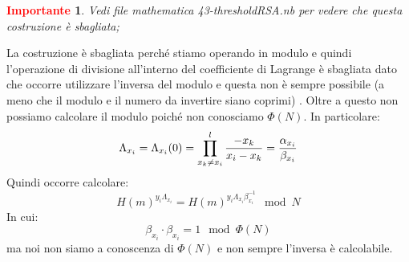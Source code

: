 \documentclass{book}
\newtheorem*{Importante}{\textbf{\textcolor{red}{Importante}}}
\begin{document}
\begin{Importante}
    Vedi file mathematica 43-thresholdRSA.nb per vedere che questa costruzione è sbagliata;
\end{Importante}
La costruzione è sbagliata perché stiamo operando in modulo e quindi l'operazione di divisione all'interno del coefficiente di Lagrange è sbagliata dato che occorre utilizzare l'inversa del modulo e questa non è sempre possibile (a meno che il modulo e il numero da invertire siano coprimi) \@. Oltre a questo non possiamo calcolare il modulo poiché non conosciamo \(\Phi(N)\).
In particolare:\begin{equation*}
    \centering
    \Lambda_{x_{i}}=\Lambda_{x_{i}}(0)=\prod_{x_{k}\neq x_{i}}^{l}{\frac{-x_{k}}{x_{i}-x_{k}}}=\frac{\alpha_{x_{i}}}{\beta_{x_{i}}}
\end{equation*}
Quindi occorre calcolare:\begin{equation*}
    {H(m)}^{y_{i}\Lambda_{x_{i}}}={H(m)}^{y_{i}\Lambda_{x_{i}}\beta_{x_{i}}^{-1}}\mod{N}
\end{equation*}
In cui:\begin{equation*}
    \beta_{x_{i}}\cdot\beta_{x_{i}}=1\mod{\Phi(N)}
\end{equation*}
ma noi non siamo a conoscenza di \(\Phi(N)\) e non sempre l'inversa è calcolabile\@.
\end{document}
